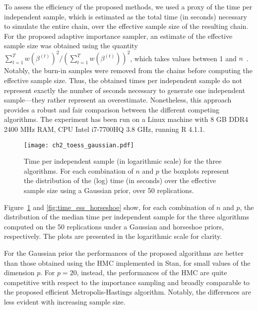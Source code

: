 To assess the efficiency of the proposed methods, we used a proxy of the time per independent sample, which is estimated as the total time (in seconds) necessary to simulate the entire chain, over the effective sample size of the resulting chain. For the proposed adaptive importance sampler, an estimate of the effective sample size was obtained using the quantity $\sum_{t=1}^T w(\beta^{(t)})^2 / (\sum_{t=1}^T w(\beta^{(t)}))^2$, which takes values between 1 and $n$~\parencite{robert2010}. 
Notably, the burn-in samples were removed from the chains before computing the effective sample size. Thus, the obtained times per independent sample  do not represent exactly the number of seconds necessary to generate one independent sample---they rather represent an overestimate. Nonetheless, this approach provides a robust and fair comparison between the different competing algorithms. The experiment has been run on a Linux machine with 8 GB DDR4 2400 MHz RAM, CPU Intel i7-7700HQ 3.8 GHz, running R 4.1.1.
%
\begin{figure}[h]
	\begin{center}
		\texttt{[image: ch2\_toess\_gaussian.pdf]}
		\caption[Comparison between the time per independent sample of the proposed algorithms and of the HMC algorithm.]{Time per independent sample (in logarithmic scale) for the three algorithms. For each combination of $n$ and $p$ the boxplots represent the distribution of the (log) time (in seconds) over the effective sample size using a Gaussian prior, over 50 replications.
		\label{fig:time_ess}}
	\end{center}
\end{figure}

Figure~\ref{fig:time_ess} and \ref{fig:time_ess_horseshoe} show, for each combination of $n$ and $p$, the distribution of the median time per independent sample for the three algorithms computed on the 50 replications under a Gaussian and horseshoe priors, respectively. The plots are presented in the logarithmic scale for clarity. 

For the Gaussian prior the performances of the proposed algorithms are better than those obtained using the HMC implemented in Stan, for small values of the dimension $p$. For $p=20$, instead, the performances of the HMC are quite competitive with respect to the importance sampling and broadly comparable to the proposed efficient Metropolis-Hastings algorithm. Notably, the differences are less evident with increasing sample size. 

